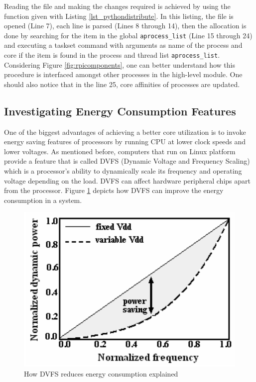 Reading the file and making the changes required is achieved by using the function given with Listing \ref{lst_pythondistribute}. In this listing, the file is opened (Line 7), each line is parsed (Lines 8 through 14), then the allocation is done by searching for the item in the global \texttt{aprocess{\_}list} (Line 15 through 24) and executing a taskset command with arguments as name of the process and core if the item is found in the process and thread list \texttt{aprocess{\_}list}. Considering Figure \ref{fig:rpicomponents}, one can better understand how this procedure is interfaced amongst other processes in the high-level module. One should also notice that in the line 25, core affinities of processes are updated.


\subsection{Investigating Energy Consumption Features}
One of the biggest advantages of achieving a better core utilization is to invoke energy saving features of processors by running CPU at lower clock speeds and lower voltages. As mentioned before, computers that run on Linux platform provide a feature that is called DVFS (Dynamic Voltage and Frequency Scaling) \cite{dvfsieee} which is a processor's ability to dynamically scale its frequency and operating voltage depending on the load. DVFS can affect hardware peripheral chips apart from the processor. Figure \ref{fig:dvfsexplanation} \cite{dvfspaper} depicts how DVFS can improve the energy consumption in a system.

\begin{figure}[!ht]
	\centering
	\captionsetup{justification=centering}
	\includegraphics[scale=0.40]{content/images/dvfsexplanation.png}
	\caption{How DVFS reduces energy consumption explained \cite{dvfspaper}}
	\label{fig:dvfsexplanation}
\end{figure}

